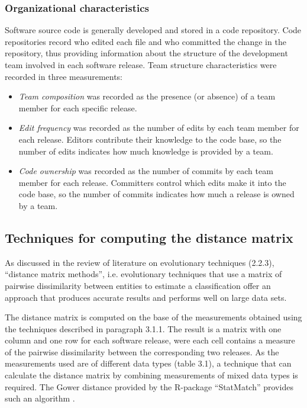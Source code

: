 \subsubsection{Organizational characteristics}
Software source code is generally developed and stored in a code repository. Code repositories record who edited each file and who committed the change in the repository, thus providing information about the structure of the development team involved in each software release. Team structure characteristics were recorded in three measurements:

\begin{itemize}
\item{\textit{Team composition} was recorded as the presence (or absence) of a team member for each specific release.}
  
\item{\textit{Edit frequency} was recorded as the number of edits by each team member for each release. Editors contribute their knowledge to the code base, so the number of edits indicates how much knowledge is provided by a team.}
  
\item{\textit{Code ownership} was recorded as the number of commits by each team member for each release. Committers control which edits make it into the code base, so the number of commits indicates how much a release is owned by a team.}
\end{itemize}

\subsection{Techniques for computing the distance matrix}
As discussed in the review of literature on evolutionary techniques (2.2.3), “distance matrix methods”, i.e. evolutionary techniques that use a matrix of pairwise dissimilarity between entities to estimate a classification \citep{FelsensteinJ.andFelenstein2004a} offer an approach that produces accurate results and performs well on large data sets.

The distance matrix is computed on the base of the measurements obtained using the techniques described in paragraph 3.1.1. The result is a matrix with one column and one row for each software release, were each cell contains a measure of the pairwise dissimilarity between the corresponding two releases. As the measurements used are of different data types (table 3.1), a technique that can calculate the distance matrix by combining measurements of mixed data types is required. The Gower distance provided by the R-package “StatMatch” provides such an algorithm \citep{DOrazio2016}.

